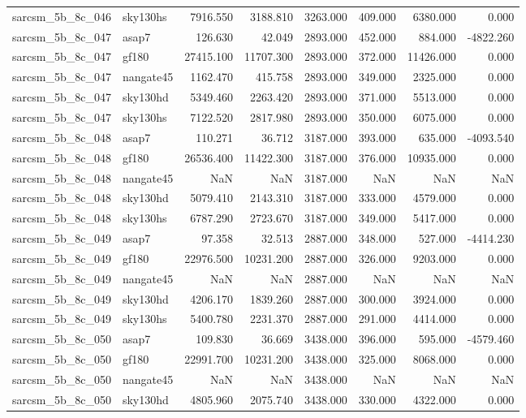 \begin{tabular}{llrrrrrr}
sarcsm\_5b\_8c\_046 & sky130hs & 7916.550 & 3188.810 & 3263.000 & 409.000 & 6380.000 & 0.000 \\
sarcsm\_5b\_8c\_047 & asap7 & 126.630 & 42.049 & 2893.000 & 452.000 & 884.000 & -4822.260 \\
sarcsm\_5b\_8c\_047 & gf180 & 27415.100 & 11707.300 & 2893.000 & 372.000 & 11426.000 & 0.000 \\
sarcsm\_5b\_8c\_047 & nangate45 & 1162.470 & 415.758 & 2893.000 & 349.000 & 2325.000 & 0.000 \\
sarcsm\_5b\_8c\_047 & sky130hd & 5349.460 & 2263.420 & 2893.000 & 371.000 & 5513.000 & 0.000 \\
sarcsm\_5b\_8c\_047 & sky130hs & 7122.520 & 2817.980 & 2893.000 & 350.000 & 6075.000 & 0.000 \\
sarcsm\_5b\_8c\_048 & asap7 & 110.271 & 36.712 & 3187.000 & 393.000 & 635.000 & -4093.540 \\
sarcsm\_5b\_8c\_048 & gf180 & 26536.400 & 11422.300 & 3187.000 & 376.000 & 10935.000 & 0.000 \\
sarcsm\_5b\_8c\_048 & nangate45 & NaN & NaN & 3187.000 & NaN & NaN & NaN \\
sarcsm\_5b\_8c\_048 & sky130hd & 5079.410 & 2143.310 & 3187.000 & 333.000 & 4579.000 & 0.000 \\
sarcsm\_5b\_8c\_048 & sky130hs & 6787.290 & 2723.670 & 3187.000 & 349.000 & 5417.000 & 0.000 \\
sarcsm\_5b\_8c\_049 & asap7 & 97.358 & 32.513 & 2887.000 & 348.000 & 527.000 & -4414.230 \\
sarcsm\_5b\_8c\_049 & gf180 & 22976.500 & 10231.200 & 2887.000 & 326.000 & 9203.000 & 0.000 \\
sarcsm\_5b\_8c\_049 & nangate45 & NaN & NaN & 2887.000 & NaN & NaN & NaN \\
sarcsm\_5b\_8c\_049 & sky130hd & 4206.170 & 1839.260 & 2887.000 & 300.000 & 3924.000 & 0.000 \\
sarcsm\_5b\_8c\_049 & sky130hs & 5400.780 & 2231.370 & 2887.000 & 291.000 & 4414.000 & 0.000 \\
sarcsm\_5b\_8c\_050 & asap7 & 109.830 & 36.669 & 3438.000 & 396.000 & 595.000 & -4579.460 \\
sarcsm\_5b\_8c\_050 & gf180 & 22991.700 & 10231.200 & 3438.000 & 325.000 & 8068.000 & 0.000 \\
sarcsm\_5b\_8c\_050 & nangate45 & NaN & NaN & 3438.000 & NaN & NaN & NaN \\
sarcsm\_5b\_8c\_050 & sky130hd & 4805.960 & 2075.740 & 3438.000 & 330.000 & 4322.000 & 0.000 \\

\end{tabular}
